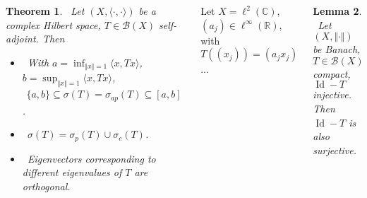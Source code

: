 \documentclass{tikzposter} %
\DeclareMathOperator{\Id}{Id}
\newtheorem{theorem}{Theorem}
\newtheorem{lemma}[theorem]{Lemma}
\begin{document}
\begin{columns}
{    \begin{theorem}
    \ Let $(X, \langle \cdot, \cdot \rangle)$ be a complex Hilbert space, $T \in \mathcal{B}(X)$ self-adjoint. Then
    \begin{itemize}
      \item \ With $a = \inf_{\Vert x \Vert = 1} \langle x, Tx \rangle$, $b = \sup_{\Vert x \Vert = 1} \langle x, Tx \rangle$,
          \begin{align*}
            \{a, b\} \subseteq \sigma(T) = \sigma_{ap}(T) \subseteq [a, b]
            \end{align*}.
       \item \ $\sigma(T) = \sigma_{p}(T) \cup \sigma_{c}(T)$.
       \item \ Eigenvectors corresponding to different eigenvalues of $T$ are orthogonal.
    \end{itemize}
    \end{theorem}
    \hphantom{}

    Let $X = \ell^{2}(\mathbb{C})$, $(a_{j}) \in \ell^{\infty}(\mathbb{R})$, with $T((x_{j})) = (a_{j}x_{j})$ ... \\

    \begin{lemma}
    \ Let $(X, \Vert \cdot \Vert)$ be Banach, $T \in \mathcal{B}(X)$ compact, $\Id - T$ injective. Then $\Id - T$ is also surjective.
    \end{lemma}




  }
\end{columns}
\end{document}
